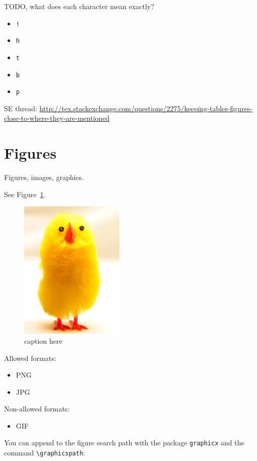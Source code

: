 \documentclass[12pt]{article}
\begin{document}
TODO, what does each character mean exactly?

\begin{itemize}
\item \lstinline|!|
\item \lstinline|h|
\item \lstinline|t|
\item \lstinline|b|
\item \lstinline|p|
\end{itemize}

SE thread: \url{http://tex.stackexchange.com/questions/2275/keeping-tables-figures-close-to-where-they-are-mentioned}

\section{Figures}\label{figures}

Figures, images, graphics.

See Figure~\ref{fig-label}.

\begin{figure}[htb]
\includegraphics[width=5cm]{image.png}
\caption{caption here}
\label{fig-label}
\end{figure}

Allowed formats:

\begin{itemize}
\item PNG
\item JPG
\end{itemize}

Non-allowed formats:

\begin{itemize}
\item GIF
\end{itemize}

You can append to the figure search path with the package \lstinline|graphicx| and the command \lstinline|\graphicspath|:
\end{document}

